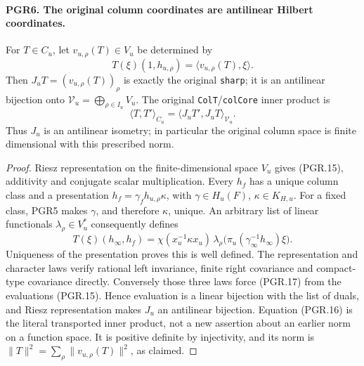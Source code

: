 \documentclass[11pt,a4paper]{article}
\numberwithin{equation}{section}
\theoremstyle{remark}\newtheorem{remark}[theorem]{Remark}
\begin{document}
\paragraph{PGR6. The original column coordinates are antilinear Hilbert coordinates.}
\label{claim:PGR6}
For \(T\in C_u\), let \(v_{u,\rho}(T)\in V_u\) be determined by
\[
       T(\xi)(1,h_{u,\rho})
                    =\langle v_{u,\rho}(T),\xi\rangle.
\tag{PGR.15}
\]
Then \(J_uT=(v_{u,\rho}(T))_\rho\) is exactly the original
\texttt{sharp}; it is an antilinear bijection onto
\(\mathcal V_u=\bigoplus_{\rho\in I_u}V_u\).  The original
\texttt{Col\allowbreak T}/\texttt{col\allowbreak Core} inner product is
\[
       \langle T,T'\rangle_{C_u}=\langle J_uT',J_uT\rangle_{\mathcal V_u}.
\tag{PGR.16}
\]
Thus \(J_u\) is an antilinear isometry; in particular the original
column space is finite dimensional with this prescribed norm.
\begin{proof}
Riesz representation on the finite-dimensional space \(V_u\)
gives (PGR.15), additivity and conjugate scalar multiplication.
Every \(h_f\) has a unique column class and a presentation
\(h_f=\gamma_fh_{u,\rho}\kappa\), with
\(\gamma\in H_u(F)\), \(\kappa\in K_{H,u}\).
For a fixed class, PGR5 makes \(\gamma\), and therefore
\(\kappa\), unique.  An arbitrary list of linear functionals
\(\lambda_\rho\in V_u^*\) consequently defines
\[
 T(\xi)(h_\infty,h_f)
   =\chi(x_u^{-1}\kappa x_u)\,
              \lambda_\rho\bigl(\pi_u(\gamma_\infty^{-1}h_\infty)\xi\bigr).
\tag{PGR.17}
\]
Uniqueness of the presentation proves this is well defined.  The
representation and character laws verify rational left invariance,
finite right covariance and compact-type covariance directly.
Conversely those three laws force (PGR.17) from the evaluations
(PGR.15).  Hence evaluation is a linear bijection with the list of
duals, and Riesz representation makes \(J_u\) an antilinear
bijection.  Equation (PGR.16) is the literal transported inner product,
not a new assertion about an earlier norm on a function space.
It is positive definite by injectivity, and its norm is
\(\|T\|^2=\sum_\rho\|v_{u,\rho}(T)\|^2\), as claimed.
\end{proof}

\end{document}
